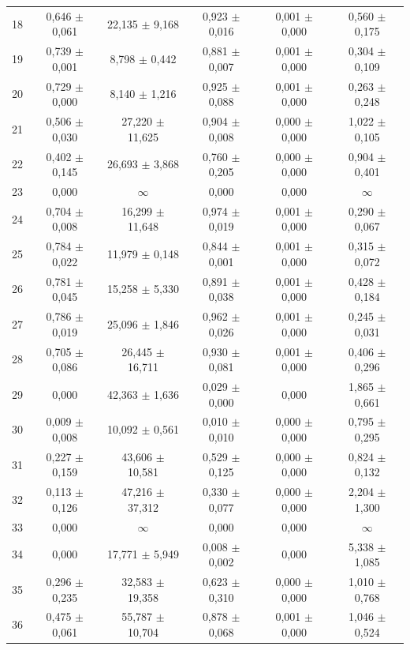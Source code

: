 \begin{tabular}{l c c c c c}
18 & 0,646 $\pm$ 0,061 & 22,135 $\pm$ 9,168 & 0,923 $\pm$ 0,016 & 0,001 $\pm$ 0,000 & 0,560 $\pm$ 0,175 \\
19 & 0,739 $\pm$ 0,001 & 8,798 $\pm$ 0,442 & 0,881 $\pm$ 0,007 & 0,001 $\pm$ 0,000 & 0,304 $\pm$ 0,109 \\
20 & 0,729 $\pm$ 0,000 & 8,140 $\pm$ 1,216 & 0,925 $\pm$ 0,088 & 0,001 $\pm$ 0,000 & 0,263 $\pm$ 0,248 \\
21 & 0,506 $\pm$ 0,030 & 27,220 $\pm$ 11,625 & 0,904 $\pm$ 0,008 & 0,000 $\pm$ 0,000 & 1,022 $\pm$ 0,105 \\
22 & 0,402 $\pm$ 0,145 & 26,693 $\pm$ 3,868 & 0,760 $\pm$ 0,205 & 0,000 $\pm$ 0,000 & 0,904 $\pm$ 0,401 \\
23 & 0,000 & $\infty$ & 0,000 & 0,000 & $\infty$ \\
24 & 0,704 $\pm$ 0,008 & 16,299 $\pm$ 11,648 & 0,974 $\pm$ 0,019 & 0,001 $\pm$ 0,000 & 0,290 $\pm$ 0,067 \\
25 & 0,784 $\pm$ 0,022 & 11,979 $\pm$ 0,148 & 0,844 $\pm$ 0,001 & 0,001 $\pm$ 0,000 & 0,315 $\pm$ 0,072 \\
26 & 0,781 $\pm$ 0,045 & 15,258 $\pm$ 5,330 & 0,891 $\pm$ 0,038 & 0,001 $\pm$ 0,000 & 0,428 $\pm$ 0,184 \\
27 & 0,786 $\pm$ 0,019 & 25,096 $\pm$ 1,846 & 0,962 $\pm$ 0,026 & 0,001 $\pm$ 0,000 & 0,245 $\pm$ 0,031 \\
28 & 0,705 $\pm$ 0,086 & 26,445 $\pm$ 16,711 & 0,930 $\pm$ 0,081 & 0,001 $\pm$ 0,000 & 0,406 $\pm$ 0,296 \\
29 & 0,000 & 42,363 $\pm$ 1,636 & 0,029 $\pm$ 0,000 & 0,000 & 1,865 $\pm$ 0,661 \\
30 & 0,009 $\pm$ 0,008 & 10,092 $\pm$ 0,561 & 0,010 $\pm$ 0,010 & 0,000 $\pm$ 0,000 & 0,795 $\pm$ 0,295 \\
31 & 0,227 $\pm$ 0,159 & 43,606 $\pm$ 10,581 & 0,529 $\pm$ 0,125 & 0,000 $\pm$ 0,000 & 0,824 $\pm$ 0,132 \\
32 & 0,113 $\pm$ 0,126 & 47,216 $\pm$ 37,312 & 0,330 $\pm$ 0,077 & 0,000 $\pm$ 0,000 & 2,204 $\pm$ 1,300 \\
33 & 0,000 & $\infty$ & 0,000 & 0,000 & $\infty$ \\
34 & 0,000 & 17,771 $\pm$ 5,949 & 0,008 $\pm$ 0,002 & 0,000 & 5,338 $\pm$ 1,085 \\
35 & 0,296 $\pm$ 0,235 & 32,583 $\pm$ 19,358 & 0,623 $\pm$ 0,310 & 0,000 $\pm$ 0,000 & 1,010 $\pm$ 0,768 \\
36 & 0,475 $\pm$ 0,061 & 55,787 $\pm$ 10,704 & 0,878 $\pm$ 0,068 & 0,001 $\pm$ 0,000 & 1,046 $\pm$ 0,524 \\

\end{tabular}

